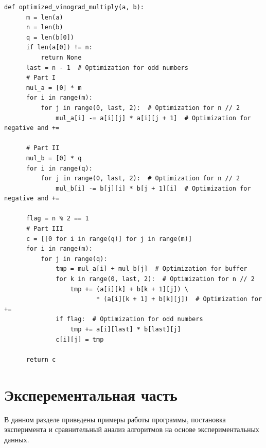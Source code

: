 \documentclass[a4paper,12pt]{report}
\begin{document}
\begin{lstlisting}[caption=Функция умножения матриц оптимизированным алгоритмом Винограда]
  def optimized_vinograd_multiply(a, b):
      m = len(a)
      n = len(b)
      q = len(b[0])
      if len(a[0]) != n:
          return None
      last = n - 1  # Optimization for odd numbers
      # Part I
      mul_a = [0] * m
      for i in range(m):
          for j in range(0, last, 2):  # Optimization for n // 2
              mul_a[i] -= a[i][j] * a[i][j + 1]  # Optimization for negative and +=

      # Part II
      mul_b = [0] * q
      for i in range(q):
          for j in range(0, last, 2):  # Optimization for n // 2
              mul_b[i] -= b[j][i] * b[j + 1][i]  # Optimization for negative and +=

      flag = n % 2 == 1
      # Part III
      c = [[0 for i in range(q)] for j in range(m)]
      for i in range(m):
          for j in range(q):
              tmp = mul_a[i] + mul_b[j]  # Optimization for buffer
              for k in range(0, last, 2):  # Optimization for n // 2
                  tmp += (a[i][k] + b[k + 1][j]) \
                         * (a[i][k + 1] + b[k][j])  # Optimization for +=
              if flag:  # Optimization for odd numbers
                  tmp += a[i][last] * b[last][j]
              c[i][j] = tmp

      return c
\end{lstlisting}



\chapter{Эксперементальная часть}
В данном разделе приведены примеры работы программы, постановка эксперимента и сравнительный анализ алгоритмов на основе экспериментальных данных.
\end{document}
